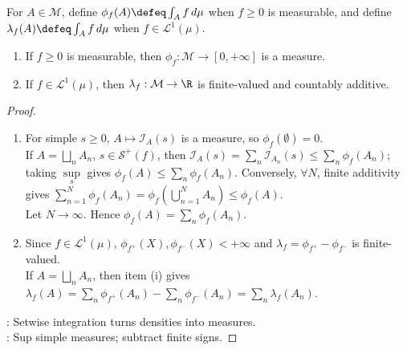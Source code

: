 \begin{theorem} \label{thm:integral-countably-additive-set-function} \\
For $A\in\mathcal{M}$, define $\phi_f(A)\defeq\int_Af\,d\mu$ when $f\geq0$ is measurable, and define $\lambda_f(A)\defeq\int_Af\,d\mu$ when $f\in\mathscr{L}^1(\mu)$.
\begin{enumerate}[label=(\roman*)]
\setlength{\itemsep}{0pt}
\item If $f\geq0$ is measurable, then $\phi_f:\mathcal{M}\to[0,+\infty]$ is a measure.
\item If $f\in\mathscr{L}^1(\mu)$, then $\lambda_f:\mathcal{M}\to\R$ is finite-valued and countably additive.
\end{enumerate}
\begin{proof}
\begin{enumerate}[label=(\roman*)]
\setlength{\itemsep}{0pt}
\item For simple $s\geq0$, $A\mapsto\mathcal{I}_A(s)$ is a measure, so $\phi_f(\emptyset)=0$.\\
If $A=\bigsqcup\limits_nA_n$, $s\in\mathcal{S}^+(f)$, then $\mathcal{I}_A(s)=\sum\limits_n\mathcal{I}_{A_n}(s)\leq\sum\limits_n\phi_f(A_n)$; taking $\sup\limits_s$ gives $\phi_f(A)\leq\sum\limits_n\phi_f(A_n)$. Conversely, $\forall N$, finite additivity gives $\sum\limits_{n=1}^{N}\phi_f(A_n)=\phi_f(\bigcup\limits_{n=1}^{N}A_n)\leq\phi_f(A)$.\\
Let $N\to\infty$. Hence $\phi_f(A)=\sum\limits_n\phi_f(A_n)$.
\item Since $f\in\mathscr{L}^1(\mu)$, $\phi_{f^+}(X),\phi_{f^-}(X)<+\infty$ and $\lambda_f=\phi_{f^+}-\phi_{f^-}$ is finite-valued.\\
If $A=\bigsqcup\limits_nA_n$, then item (i) gives $\lambda_f(A)=\sum\limits_n\phi_{f^+}(A_n)-\sum\limits_n\phi_{f^-}(A_n)=\sum\limits_n\lambda_f(A_n)$.
\end{enumerate}
: Setwise integration turns densities into measures.\\
: Sup simple measures; subtract finite signs.
\end{proof}
\end{theorem}

